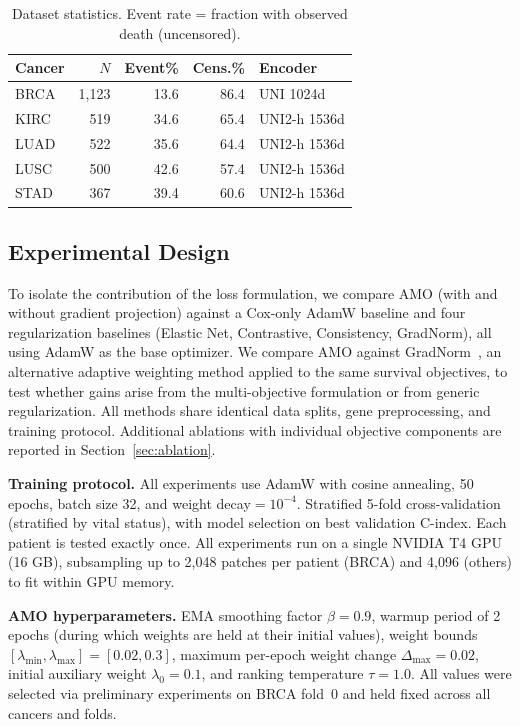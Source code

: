 \documentclass[10pt,twocolumn,letterpaper]{article}
\begin{document}
\begin{table}[t]
\centering
\caption{Dataset statistics. Event rate = fraction with observed
death (uncensored).}
\label{tab:datasets}
\begin{tabular}{lrrrl}
\toprule
Cancer & $N$ & Event\% & Cens.\% & Encoder \\
\midrule
BRCA & 1{,}123 & 13.6 & 86.4 & UNI 1024d \\
KIRC & 519   & 34.6 & 65.4 & UNI2-h 1536d \\
LUAD & 522   & 35.6 & 64.4 & UNI2-h 1536d \\
LUSC & 500   & 42.6 & 57.4 & UNI2-h 1536d \\
STAD & 367   & 39.4 & 60.6 & UNI2-h 1536d \\
\bottomrule
\end{tabular}
\end{table}

\subsection{Experimental Design}
\label{sec:clam_exp}

To isolate the contribution of the loss formulation, we compare
AMO (with and without gradient projection) against a Cox-only
AdamW baseline and four regularization baselines (Elastic Net,
Contrastive, Consistency, GradNorm), all using AdamW as the base
optimizer. We compare AMO against GradNorm~\cite{chen2018gradnorm},
an alternative adaptive weighting method applied to the same
survival objectives, to test whether gains arise from the
multi-objective formulation or from generic regularization.
All methods share identical data splits, gene preprocessing,
and training protocol.
Additional ablations with
individual objective components are reported in
Section~\ref{sec:ablation}.

\textbf{Training protocol.}
All experiments use AdamW with cosine annealing,
50 epochs, batch size 32, and weight decay$\!=\!10^{-4}$.
Stratified 5-fold cross-validation (stratified by vital status),
with model selection on best validation C-index. Each patient is
tested exactly once. All experiments run on a single NVIDIA T4
GPU (16 GB), subsampling up to 2,048 patches per patient (BRCA)
and 4,096 (others) to fit within GPU memory.

\noindent\textbf{AMO hyperparameters.}
EMA smoothing factor $\beta = 0.9$, warmup period of 2 epochs
(during which weights are held at their initial values),
weight bounds $[\lambda_{\min}, \lambda_{\max}] = [0.02, 0.3]$,
maximum per-epoch weight change $\Delta_{\max} = 0.02$,
initial auxiliary weight $\lambda_0 = 0.1$, and ranking
temperature $\tau = 1.0$. All values were selected via
preliminary experiments on BRCA fold~0 and held fixed across
all cancers and folds.
\end{document}
